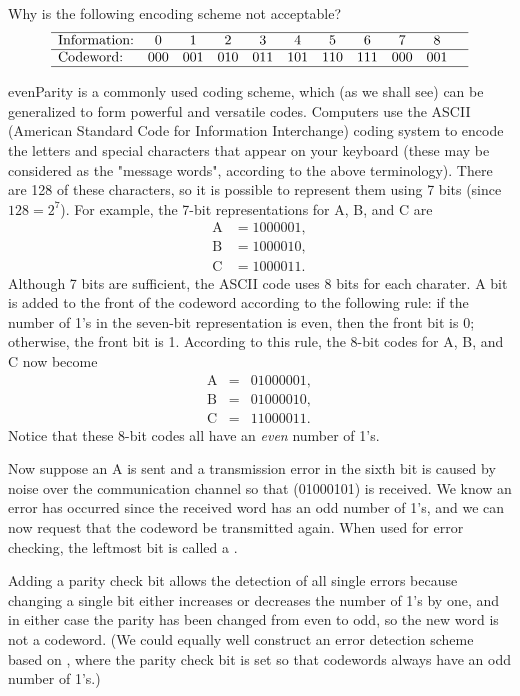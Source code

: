 \begin{exercise}{}
Why is the following encoding scheme not acceptable?
\[
\begin{array}{lcccccccccc}
\hline
\mbox{Information:} & 0 & 1 & 2 & 3 & 4 & 5 & 6 & 7 & 8 &
\\ \hline
\mbox{Codeword:} & 000 & 001 & 010 & 011 & 101 & 110
& 111 & 000 & 001 \\ \hline
\end{array}
\]
 \end{exercise} 
 
\begin{example}{evenParity}
 is a  commonly  used coding scheme, which (as we shall see) can be generalized to form powerful and versatile codes. Computers use the ASCII (American
Standard Code for Information Interchange) coding system to encode the letters and special characters that appear on your keyboard (these may be considered as the "message words", according to the above terminology). There are 128 of these characters, so it is possible to represent them using 7 bits (since  $128 = 2^7$).   For example, the 7-bit representations for A, B, and C are 
\begin{align*}
\textrm{A} & = 1000001, \\
\textrm{B} & = 1000010, \\
\textrm{C} & =  1000011.
\end{align*}
Although 7 bits are sufficient, the ASCII code uses 8 bits for each charater. A bit is added to the front of the codeword according to the following rule:  if the number of 1's in the seven-bit 
representation is even, then the front bit is 0; otherwise, the front bit is 1. 
According to this rule, the 8-bit codes
for A, B, and C now become 
\begin{align*}
\textrm{A} & = & 01000001, \\
\textrm{B} & = & 01000010, \\
\textrm{C} & = & 11000011.
\end{align*}
Notice that these 8-bit codes all have an \emph{even} number of 1's.

Now suppose an A is sent and a transmission error in the sixth
bit is caused by noise over the communication channel so that 
(01000101) is received. We know an error has occurred since the
received word has an odd number of 1's, and we can now request that the
codeword be transmitted again. When used for error checking, the
leftmost bit is called a .  
  
Adding a parity check bit allows the detection of all single errors
because changing a single bit either increases or decreases the number
of 1's by one, and in either case the parity has been changed from
even to odd, so the new word is not a codeword. (We could equally well
construct an error detection scheme based on , where the parity check bit is set so that codewords always have an
odd number of 1's.)  
\end{example} 

